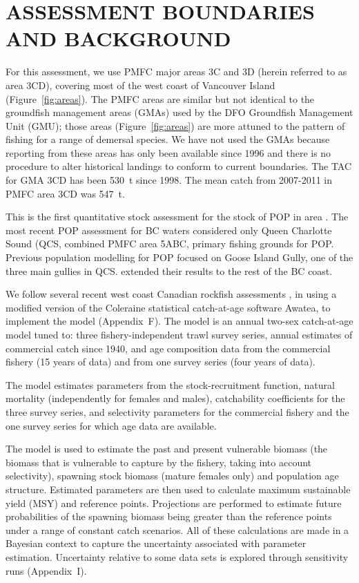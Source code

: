 \section{ASSESSMENT BOUNDARIES AND BACKGROUND}

For this assessment, we use PMFC major areas 3C and 3D (herein referred to as area 3CD), covering most of the west coast of Vancouver Island (Figure~\ref{fig:areas}). The PMFC areas are similar but not identical to the groundfish management areas (GMAs) used by the DFO Groundfish Management Unit (GMU); those areas (Figure~\ref{fig:areas}) are more attuned to the pattern of fishing for a range of demersal species. We have not used the GMAs because reporting from these areas has only been available since 1996 and there is no procedure to alter historical landings to conform to current boundaries. The TAC for GMA 3CD has been 530~t since 1998. The mean catch from 2007-2011 in PMFC area 3CD was 547~t.

This is the first quantitative stock assessment for the stock of POP in area \area. The most recent POP assessment for BC waters considered only Queen Charlotte Sound (QCS, combined PMFC area 5ABC,  primary fishing grounds for POP. Previous population modelling for POP focused on Goose Island Gully, one of the three main gullies in QCS. extended their results to the rest of the BC coast. %


We follow several recent west coast Canadian rockfish assessments , in using a modified version of the Coleraine statistical catch-at-age software  Awatea, to implement the model (Appendix~F). The model is an annual two-sex catch-at-age model tuned to: three fishery-independent trawl survey series, annual estimates of commercial catch since 1940, and age composition data from the commercial fishery (15 years of data) and from one survey series (four years of data). 

The model estimates parameters from the stock-recruitment function, natural mortality (independently for females and males), catchability coefficients for the three survey series, and selectivity parameters for the commercial fishery and the one survey series for which age data are available.

The model is used to estimate the past and present vulnerable biomass (the biomass that is vulnerable to capture by the fishery, taking into account selectivity), spawning stock biomass (mature females only) and population age structure. Estimated parameters are then used to calculate maximum sustainable yield (MSY) and reference points. Projections are performed to estimate future probabilities of the spawning biomass being greater than the reference points under a range of constant catch scenarios. All of these calculations are made in a Bayesian context to capture the uncertainty associated with parameter estimation. Uncertainty relative to some data sets is explored through sensitivity runs (Appendix~I).

